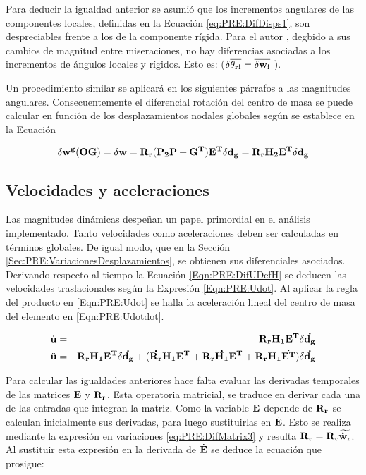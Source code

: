  Para deducir la igualdad anterior se asumió que los incrementos angulares de las componentes locales, definidas en la Ecuación \eqref{eq:PRE:DifDisps1}, son despreciables frente a los de la componente rígida. Para el autor \cite{Le2014}, degbido a sus cambios de magnitud entre miseraciones, no hay diferencias asociadas a los incrementos de ángulos locales y rígidos. Esto es: ($\delta \overline{\bf{\theta}_{ri}}= \overline{\delta \bf{w}_i}$ ).
 
 Un procedimiento similar se aplicará en los siguientes párrafos a las magnitudes angulares. Consecuentemente el diferencial rotación del centro de masa se puede calcular en función de los desplazamientos nodales globales según se establece en la Ecuación 
 
 \begin{equation}\label{Eqn:PRE:AngularBaricentro}
 	\delta \bf{w^g} (OG) =\delta \bf{w} =\bf{R}_r (\bf{P}_2\bf{P}+\bf{G}^T)\bf{E}^T\delta \bf{d}_g = \bf{R}_r\bf{H}_2\bf{E}^T \delta \bf{d}_g
 \end{equation}
 
 
 
\subsection{Velocidades y aceleraciones}\label{Sec:PRE:VelAc}

Las magnitudes dinámicas despeñan un papel primordial en el análisis implementado. Tanto velocidades como aceleraciones deben ser calculadas en términos globales. De igual modo, que en la Sección \ref{Sec:PRE:VariacionesDesplazamientos}, se obtienen sus diferenciales asociados. Derivando respecto al tiempo la Ecuación \eqref{Eqn:PRE:DifUDefH} se deducen las velocidades traslacionales según la Expresión \eqref{Eqn:PRE:Udot}. Al aplicar la regla del producto en \eqref{Eqn:PRE:Udot} se halla la aceleración lineal del centro de masa del elemento en \eqref{Eqn:PRE:Udotdot}. 

 \begin{eqnarray}
 	\label{Eqn:PRE:Udot}
	\dot{\bf{u}} &=&\bf{R}_r \bf{H}_1 \bf{E}^T \delta \dot{ \bf{d}_g }\\
	\label{Eqn:PRE:Udotdot}
	\ddot{\bf{u}}& = &\bf{R}_r \bf{H}_1 \bf{E}^T \delta \dot{ \bf{d}_g }+ (\dot{\bf{R}_r} \bf{H}_1 \bf{E}^T+\bf{R}_r \dot{\bf{H}_1} \bf{E}^T+\bf{R}_r \bf{H}_1 \dot{\bf{E}^T})\delta \dot{ \bf{d}_g }	
\end{eqnarray}

Para calcular las igualdades anteriores hace falta evaluar las derivadas temporales de las matrices $\bf{E}$ y $\bf{R}_r$. Esta operatoria matricial, se traduce en derivar cada una de las entradas que integran la matriz. Como la variable $\bf{E}$ depende de $\bf{R}_r$ se calculan inicialmente sus derivadas, para luego sustituirlas en $\dot{\bf{E}}$. Esto se realiza mediante la expresión en variaciones \eqref{eq:PRE:DifMatrix3} y resulta $\bf{R}_r=\bf{R_r}\widetilde{\dot{\bf{w}}_r}$. Al sustituir esta expresión en la derivada de $\dot{\bf{E}}$ se deduce la ecuación que prosigue:

